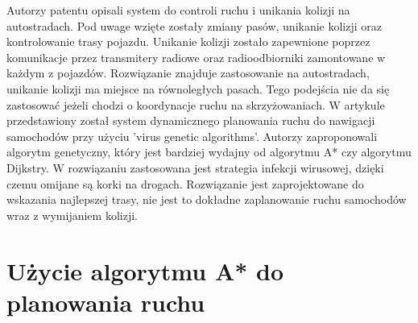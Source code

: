 \newline
\indent
Autorzy patentu \cite{broxmeyer1994vehicle} opisali system do controli ruchu i unikania kolizji na autostradach. Pod uwage wzięte zostały zmiany pasów, unikanie kolizji oraz kontrolowanie trasy pojazdu. Unikanie kolizji zostało zapewnione poprzez komunikacje przez transmitery radiowe oraz radioodbiorniki zamontowane w każdym z pojazdów. Rozwiązanie znajduje zastosowanie na autostradach, unikanie kolizji ma miejsce na równoległych pasach. Tego podejścia nie da się zastosować jeżeli chodzi o koordynacje ruchu na skrzyżowaniach.
\newline
\indent
W artykule \cite{kanoh2007dynamic} przedstawiony został system dynamicznego planowania ruchu do nawigacji samochodów przy użyciu 'virus genetic algorithms'. Autorzy zaproponowali algorytm genetyczny, który jest bardziej wydajny od algorytmu A* czy algorytmu Dijkstry. W rozwiązaniu zastosowana jest strategia infekcji wirusowej, dzięki czemu omijane są korki na drogach. Rozwiązanie jest zaprojektowane do wskazania najlepszej trasy, nie jest to dokładne zaplanowanie ruchu samochodów wraz z wymijaniem kolizji.

\section{Użycie algorytmu A* do planowania ruchu}

